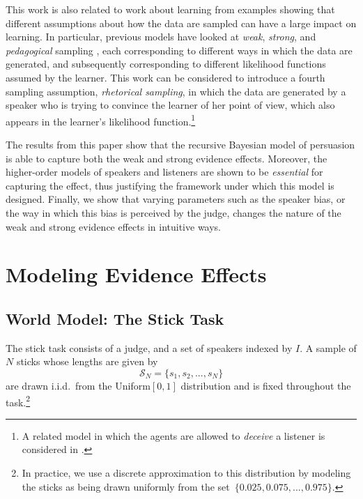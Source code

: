 \documentclass[10pt,letterpaper]{article}
\begin{document}
This work is also related to work about learning from examples showing that different assumptions
about how the data are sampled can have a large impact on learning. In particular, previous models have 
looked at \textit{weak}, \textit{strong}, and \textit{pedagogical} sampling 
\cite{hsu2009differential, shafto_rational_2014, tenenbaum1999bayesian, tenenbaum2001generalization}, each corresponding to different ways
in which the data are generated, and subsequently corresponding to different likelihood functions assumed by
the learner. This work can be considered to introduce a fourth sampling assumption, \textit{rhetorical sampling},
in which the data are generated by a speaker who is trying to convince the learner of her point of view, which
also appears in the learner's likelihood function.\footnote{A related model in which the agents are allowed to \textit{deceive}
a listener is considered in .	}

The results from this paper show that the recursive Bayesian model of persuasion is able to capture both the
weak and strong evidence effects. Moreover, the higher-order models of speakers and listeners are shown to
be \textit{essential} for capturing the effect, thus justifying the framework under which this model is designed. 
Finally, we show that varying parameters such as the speaker bias, or the way in which this bias is perceived by
the judge, changes the nature of the weak and strong evidence effects in intuitive ways.

\section{Modeling Evidence Effects}
\subsection{World Model: The Stick Task}
The stick task consists of a judge, and a set of speakers indexed by $I$. 
A sample of $N$ sticks whose lengths are given by
\begin{equation}
\mathcal{S}_N = \{ s_1, s_2, ..., s_N \}
\end{equation}
are drawn i.i.d.\ from the Uniform$[0,1]$ distribution and is fixed throughout
the task.\footnote{In practice, we use a discrete approximation to this distribution 
by modeling the sticks as being drawn uniformly from the set~${\{ 0.025, 0.075, ..., 0.975\}}$.} 
\end{document}
